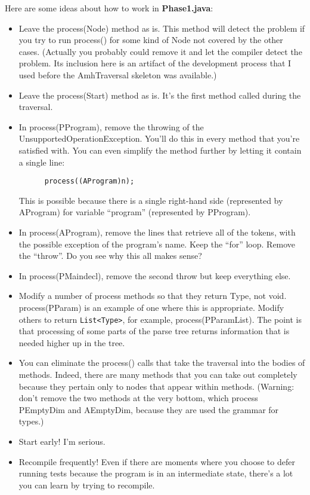\documentclass[11pt]{article}
\begin{document}
Here are some ideas about how to work in {\bf Phase1.java}:
\begin{itemize}
\item Leave the process(Node) method as is.  This method will detect the problem if you try to run process() for some kind of Node not covered by the other cases.  (Actually you probably could remove it and let the compiler detect the problem.  Its inclusion here is an artifact of the development process that I used before the AmhTraversal skeleton was available.)

\item Leave the process(Start) method as is.  It's the first method called during the traversal.

\item In process(PProgram), remove the throwing of the UnsupportedOperationException.  You'll do this in every method that you're satisfied with.  You can even simplify the method further by letting it contain a single line:
\begin{verbatim}
      process((AProgram)n);
\end{verbatim}
This is possible because there is a single right-hand side (represented by AProgram) for variable ``program'' (represented by PProgram).

\item In process(AProgram), remove the lines that retrieve all of the tokens, with the possible exception of the program's name.  Keep the ``for'' loop.  Remove the ``throw''.  Do you see why this all makes sense?

\item In process(PMaindecl), remove the second throw but keep everything else.

\item Modify a number of process methods so that they return Type, not void.  process(PParam) is an example of one where this is appropriate.  Modify others to return \verb'List<Type>', for example, process(PParamList).  The point is that processing of some parts of the parse tree returns information that is needed higher up in the tree.

\item You can eliminate the process() calls that take the traversal into the bodies of methods.  Indeed, there are many methods that you can take out completely because they pertain only to nodes that appear within methods.  (Warning:  don't remove the two methods at the very bottom, which process PEmptyDim and AEmptyDim, because they are used the grammar for types.)

\item Start early!  I'm serious.

\item Recompile frequently!  Even if there are moments where you choose to defer running tests because the program is in an intermediate state, there's a lot you can learn by trying to recompile.

\end{itemize}
\end{document}

